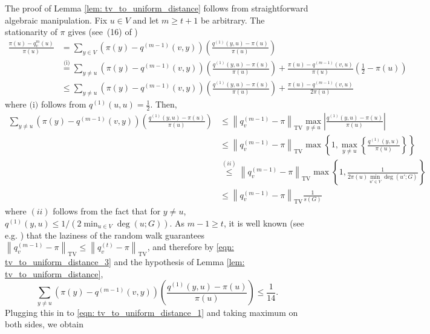 \documentclass[11pt,twoside]{article}
\newcommand{\set}[1]{\left\{#1\right\}}
\newcommand{\abs}[1]{\left \lvert #1 \right \rvert}
\newcommand{\norm}[1]{\left\lVert#1\right\rVert}
\newcommand{\1}{\mathbf{1}}
\begin{document}
The proof of Lemma \ref{lem: tv_to_uniform_distance} follows from straightforward algebraic manipulation. Fix $u \in V$ and let $m \geq t + 1$ be arbitrary. The stationarity of $\pi$ gives (see~(16) of \citep{morris2005})
\begin{align}
\frac{\pi(u) - q_v^{m}(u)}{\pi(u)} & = \sum_{y \in V} \left(\pi(y) - q^{(m-1)}(v,y)\right) \left(\frac{q^{(1)}(y,u) - \pi(u)}{\pi(u)}\right) \nonumber \\
& \overset{\text{(i)}}{=} \sum_{y \neq u} \left(\pi(y) - q^{(m-1)}(v,y)\right) \left(\frac{q^{(1)}(y,u) - \pi(u)}{\pi(u)}\right) + \frac{\pi(u) - q^{(m - 1)}(v,u)}{\pi(u)} \left(\frac{1}{2} - \pi(u)\right) \nonumber \\
& \leq \sum_{y \neq u} \left(\pi(y) - q^{(m-1)}(v,y)\right) \left(\frac{q^{(1)}(y,u) - \pi(u)}{\pi(u)}\right) + \frac{\pi(u) - q^{(m - 1)}(v,u)}{2 \pi(u)} \label{eqn: tv_to_uniform_distance_1}
\end{align}
where $\text{(i)}$ follows from $q^{(1)}(u,u) = \frac{1}{2}$. Then,
\begin{align}
\sum_{y \neq u} \left(\pi(y) - q^{(m-1)}(v,y)\right) \left(\frac{q^{(1)}(y,u) - \pi(u)}{\pi(u)}\right) & \leq \norm{q_v^{(m-1)} - \pi}_{\mathrm{TV}} \max_{y \neq u} \abs{\frac{q^{(1)}(y,u) - \pi(u)}{\pi(u)}} \nonumber \\
& \leq \norm{q_v^{(m-1)} - \pi}_{\mathrm{TV}} \max \set{1, \max_{y \neq u}\set{\frac{q^{(1)}(y,u)}{\pi(u)}}} \nonumber \\
& \overset{(ii)}{\leq} \norm{q_v^{(m-1)} - \pi}_{\mathrm{TV}} \max \set{1, \frac{1}{2 \pi(u) \min_{u' \in V} \deg(u';G) }} \nonumber \\
& \leq \norm{q_v^{(m-1)} - \pi}_{\mathrm{TV}} \frac{1}{s(G)} \label{eqn: tv_to_uniform_distance_3}
\end{align}
where $(ii)$ follows from the fact that for $y \neq u$, $q^{(1)}(y,u) \leq 1/\left(2 \min_{u \in V} \deg(u; G)\right)$. As $m - 1 \geq t$, it is well known (see e.g. \cite{lovasz1990}) that the laziness of the random walk guarantees $\norm{q_v^{(m - 1)} - \pi}_{\mathrm{TV}} \leq \norm{q_v^{(t)} - \pi}_{\mathrm{TV}}$, and therefore by \eqref{eqn: tv_to_uniform_distance_3} and the hypothesis of Lemma \ref{lem: tv_to_uniform_distance},
\begin{equation*}
\sum_{y \neq u} \left(\pi(y) - q^{(m-1)}(v,y)\right) \left(\frac{q^{(1)}(y,u) - \pi(u)}{\pi(u)}\right) \leq \frac{1}{14}.
\end{equation*}
Plugging this in to \eqref{eqn: tv_to_uniform_distance_1} and taking maximum on both sides, we obtain
\end{document}
